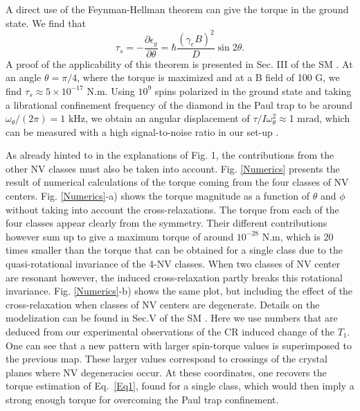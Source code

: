 \documentclass[preprintnumbers,amsmath,amssymb,superscriptaddress,twocolumn,showpacs]{revtex4-1}
\begin{document}
A direct use of the Feynman-Hellman theorem can give the torque in the ground state. We find that 
\begin{equation}\tau_s=- \frac{\partial \epsilon_g}{\partial \theta}=\hbar  \frac{(\gamma_e B)^2}{D} \sin 2\theta.\label{Eq1}
\end{equation}
A proof of the applicability of this theorem is presented in  Sec. III of the SM \cite{SM_CR_meca}. 
At an angle $\theta=\pi/4$, where the torque is maximized and at a B field of 100 G, we find $\tau_s\approx 5\times 10^{-17}$ N.m. Using $10^9$ spins polarized in the ground state and taking a librational confinement frequency of the diamond in the Paul trap to be around $\omega_\theta/(2\pi)=1$ kHz, we obtain an angular displacement 
of $\tau/I\omega_\theta^2\approx$1 mrad, which can be measured with a high signal-to-noise ratio in our set-up \cite{DelordNat}.


As already hinted to in the explanations of Fig. 1, the contributions from the other NV classes must also be taken into account.
Fig. \ref{Numerics} presents the result of numerical calculations of the torque coming from the four classes of NV centers.   
Fig. \ref{Numerics}-a) shows the torque magnitude as a function of $\theta$ and $\phi$ without taking into account the cross-relaxations. The torque from each of the four classes appear clearly from the symmetry. Their different contributions however sum up to give a maximum torque of around $10^{-28}$ N.m, which is 20 times smaller than the torque that can be obtained for a single class due to the quasi-rotational invariance of the 4-NV classes. When two classes of NV center are resonant however, the induced cross-relaxation partly breaks this rotational invariance. 
Fig. \ref{Numerics}-b) shows the same plot, but including the effect of the cross-relaxation when classes of NV centers are degenerate. Details on the modelization can be found in Sec.V of the SM \cite{SM_CR_meca}.
Here we use numbers that are deduced from our experimental observations of the CR induced change of the $T_1$.
One can see that a new pattern with larger spin-torque values is superimposed to the previous map. These larger values correspond to crossings of the crystal planes where NV degeneracies occur. 
At these coordinates, one recovers the torque estimation of Eq.~\ref{Eq1}, found for a single class, which would then imply a strong enough torque for overcoming the Paul trap confinement. 
\end{document}
